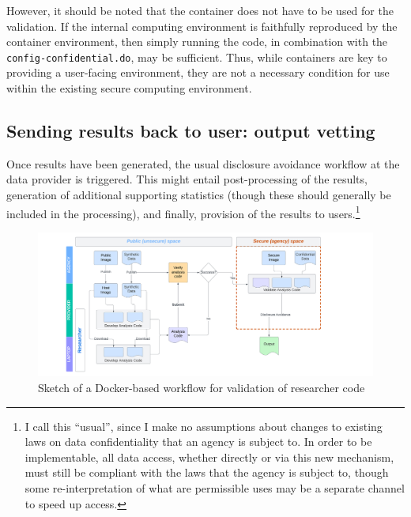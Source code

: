 \documentclass[inline]{hdsr}
\begin{document}



\noindent However, it should be noted that the container does not have to be used for the validation. If the internal computing environment is faithfully reproduced by the container environment, then simply running the code, in combination with the \texttt{config-confidential.do}, may be sufficient. Thus, while containers are key to providing a user-facing environment, they are not a necessary condition for use within the existing secure computing environment.

\subsection{Sending results back to user: output vetting}

Once results have been generated, the usual disclosure avoidance workflow at the data provider is triggered. This might entail post-processing of the results, generation of additional supporting statistics (though these should generally be included in the processing), and finally, provision of the results to users.\footnote{I call this ``usual'', since I make no assumptions about changes to existing laws on data confidentiality that an agency is subject to. In order to be implementable, all data access, whether directly or via this new mechanism, must still be compliant with the laws that the agency is subject to, though some re-interpretation of what are permissible uses may be a separate channel to speed up access.}

\begin{figure}
    \centering
    \includegraphics[width=1\linewidth]{NBER Docker Flow.png}
    \caption{Sketch of a Docker-based workflow for validation of researcher code}
    \label{fig:docker-workflow}
\end{figure}
\end{document}

